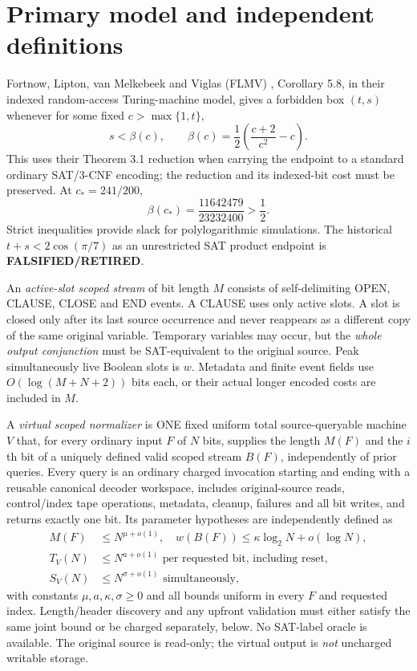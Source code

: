 \documentclass[11pt]{article}
\begin{document}
\section{Primary model and independent definitions}
Fortnow, Lipton, van Melkebeek and Viglas (FLMV) \cite{flmv}, Corollary 5.8, in their indexed random-access Turing-machine model, gives a forbidden box $(t,s)$ whenever for some fixed $c>\max\{1,t\}$,
\[
s<\beta(c),\qquad
\beta(c)=\frac12\left(\frac{c+2}{c^2}-c\right).
\tag{1}
\]
This uses their Theorem 3.1 reduction when carrying the endpoint to a standard ordinary SAT/3-CNF encoding; the reduction and its indexed-bit cost must be preserved. At $c_*=241/200$,
\[
\beta(c_*)=\frac{11642479}{23232400}>\frac12.
\tag{2}
\]
Strict inequalities provide slack for polylogarithmic simulations. The historical $t+s<2\cos(\pi/7)$ as an unrestricted SAT product endpoint is \textbf{FALSIFIED/RETIRED}.

An \emph{active-slot scoped stream} of bit length $M$ consists of self-delimiting OPEN, CLAUSE, CLOSE and END events. A CLAUSE uses only active slots. A slot is closed only after its last source occurrence and never reappears as a different copy of the same original variable. Temporary variables may occur, but the \emph{whole output conjunction} must be SAT-equivalent to the original source. Peak simultaneously live Boolean slots is $w$. Metadata and finite event fields use $O(\log(M+N+2))$ bits each, or their actual longer encoded costs are included in $M$.

\par\noindent A \emph{virtual scoped normalizer} is ONE fixed uniform total source-queryable machine $V$ that, for every ordinary input $F$ of $N$ bits, supplies the length $M(F)$ and the $i$th bit of a uniquely defined valid scoped stream $B(F)$, independently of prior queries. Every query is an ordinary charged invocation starting and ending with a reusable canonical decoder workspace, includes original-source reads, control/index tape operations, metadata, cleanup, failures and all bit writes, and returns exactly one bit. Its parameter hypotheses are independently defined as
\[
\begin{split}
M(F)&\le N^{\mu+o(1)},\quad
w(B(F))\le \kappa\log_2 N+o(\log N),\\
T_V(N)&\le N^{a+o(1)}\text{ per requested bit, including reset},\\
S_V(N)&\le N^{\sigma+o(1)}\text{ simultaneously},
\end{split}\tag{3}
\]
with constants $\mu,a,\kappa,\sigma\ge0$ and all bounds uniform in every $F$ and requested index. Length/header discovery and any upfront validation must either satisfy the same joint bound or be charged separately, below. No SAT-label oracle is available. The original source is read-only; the virtual output is \emph{not} uncharged writable storage.
\end{document}
